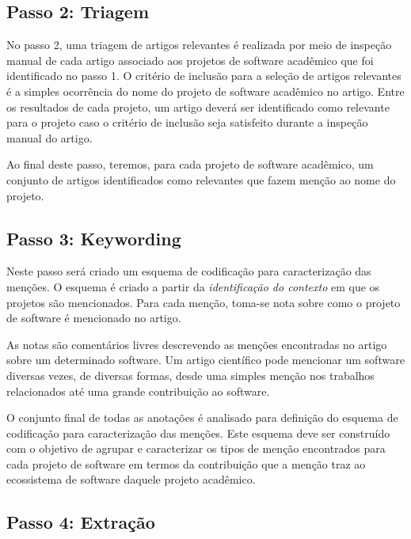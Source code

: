 \subsection{Passo 2: Triagem}

No passo 2, uma triagem de artigos relevantes é realizada por meio 
de inspeção manual de cada artigo associado aos projetos de software acadêmico
que foi identificado no passo 1.
O critério de inclusão para a seleção de artigos relevantes é a simples
ocorrência do nome do projeto de software acadêmico no artigo.
%
Entre os resultados de cada projeto,
um artigo deverá ser identificado como
relevante para o projeto caso o critério de inclusão seja satisfeito durante a
inspeção manual do artigo.

Ao final deste passo, teremos, para cada projeto
de software acadêmico, um conjunto de artigos identificados como relevantes que fazem
menção ao nome do projeto.

\subsection{Passo 3: Keywording}

Neste passo será criado um esquema de codificação para caracterização das
menções. O esquema é criado a partir da \textit{identificação do contexto} em que os
projetos são mencionados. Para cada menção, toma-se nota sobre como o projeto de
software é mencionado no artigo.

As notas são comentários livres descrevendo as menções encontradas no artigo
sobre um determinado software.
Um artigo científico pode mencionar um software
diversas vezes, de diversas formas, desde uma simples menção nos trabalhos
relacionados até uma grande contribuição ao software.

O conjunto final de todas as anotações é analisado
para definição do esquema de codificação para caracterização das menções. 
Este esquema deve ser construído com o objetivo de agrupar e caracterizar os tipos
de menção encontrados para cada projeto de software em termos da contribuição
que a menção traz ao ecossistema de software daquele projeto acadêmico.


\subsection{Passo 4: Extração}

